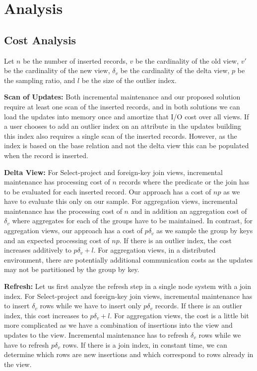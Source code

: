\section{Analysis}

\subsection{Cost Analysis}
Let $n$ be the number of inserted records, $v$ be the cardinality of the old view, $v'$ be the cardinality of the new view, $\delta_v$ be the cardinality of the delta view, $p$ be the sampling ratio, and $l$ be the size of the outlier index.  

\textbf{Scan of Updates: }
Both incremental maintenance and our proposed solution require at least one scan of the inserted records, and in both solutions we can
load the updates into memory once and amortize that I/O cost over all views. 
If a user chooses to add an outlier index on an attribute in the updates building this index also requires a single scan of the inserted records.
However, as the index is based on the base relation and not the delta view this can be populated when the record is inserted.

\textbf{Delta View: } For Select-project and foreign-key join views, incremental maintenance has processing cost of $n$ records where the predicate or the join has to be evaluated for each inserted record. Our approach has a cost of $np$ as we have to evaluate this only on our sample. For aggregation views, incremental maintenance has the processing cost of $n$ and in addition an aggregation cost of $\delta_v$ where aggregates for each of the groups have to be maintained. In contrast, for aggregation views, our approach has a cost of $p\delta_v$ as we sample the group by keys and an expected processing cost of $np$. 
If there is an outlier index, the cost increases additively to $p\delta_v+l$.
For aggregation views, in a distributed environment, there are potentially additional communication costs as the updates may not be partitioned by the group by key.

\textbf{Refresh: } Let us first analyze the refresh step in a single node system with a join index. For Select-project and foreign-key join views, incremental maintenance has to insert $\delta_v$ rows while we have to insert only $p\delta_v$ records. If there is an outlier index, this cost increases to $p\delta_v + l$. For aggregation views, the cost is a little bit more complicated as we have a combination of insertions into the view and updates to the view. 
Incremental maintenance has to refresh $\delta_v$ rows while we have to refresh $p\delta_v$ rows. 
If there is a join index, in constant time, we can determine which rows are new insertions and which correspond to rows already in the view.

